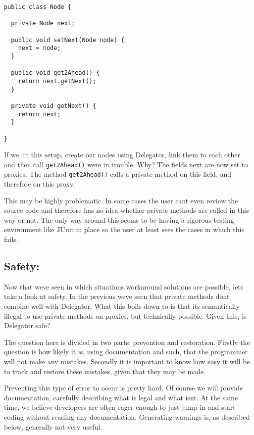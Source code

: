 \documentclass[a4paper,12pt]{book}
\begin{document}
\begin{verbatim}
public class Node {

  private Node next;

  public void setNext(Node node) {
    next = node;
  }

  public void get2Ahead() {
    return next.getNext();
  }

  private void getNext() {
    return next;
  }

}
\end{verbatim}

If we, in this setup, create our nodes using Delegator, link them to each other and then call \verb|get2Ahead()| were in trouble. Why? The fields next are now set to proxies. The method \verb|get2Ahead()| calls a private method on this field, and therefore on this proxy.

This may be highly problematic. In some cases the user cant even review the source code and therefore has no idea whether private methods are called in this way or not. The only way around this seems to be having a rigorous testing environment like JUnit in place so the user at least sees the cases in which this fails.


\subsection*{Safety:}
Now that weve seen in which situations workaround solutions are possible, lets take a look at safety. In the previous weve seen that private methods dont combine well with Delegator. What this boils down to is that its semantically illegal to use private methods on proxies, but technically possible. Given this, is Delegator safe?

The question here is divided in two parts: prevention and restoration. Firstly the question is how likely it is, using documentation and such, that the programmer will not make any mistakes. Secondly it is important to know how easy it will be to track and restore these mistakes, given that they may be made.

Preventing this type of error to occur is pretty hard. Of course we will provide documentation, carefully describing what is legal and what isnt. At the same time, we believe developers are often eager enough to just jump in and start coding without reading any documentation. Generating warnings is, as described below, generally not very useful.
\end{document}
